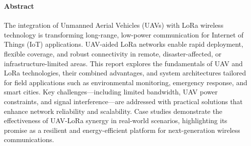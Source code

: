 \vspace{.25in}	
\begin{center}
\large{\textbf{Abstract}}\\
\vspace{0.3in}
\end{center}
\indent
\paragraph{}
The integration of Unmanned Aerial Vehicles (UAVs) with LoRa wireless technology is transforming long-range, low-power communication for Internet of Things (IoT) applications. UAV-aided LoRa networks enable rapid deployment, flexible coverage, and robust connectivity in remote, disaster-affected, or infrastructure-limited areas. This report explores the fundamentals of UAV and LoRa technologies, their combined advantages, and system architectures tailored for field applications such as environmental monitoring, emergency response, and smart cities. Key challenges—including limited bandwidth, UAV power constraints, and signal interference—are addressed with practical solutions that enhance network reliability and scalability. Case studies demonstrate the effectiveness of UAV-LoRa synergy in real-world scenarios, highlighting its promise as a resilient and energy-efficient platform for next-generation wireless communications.